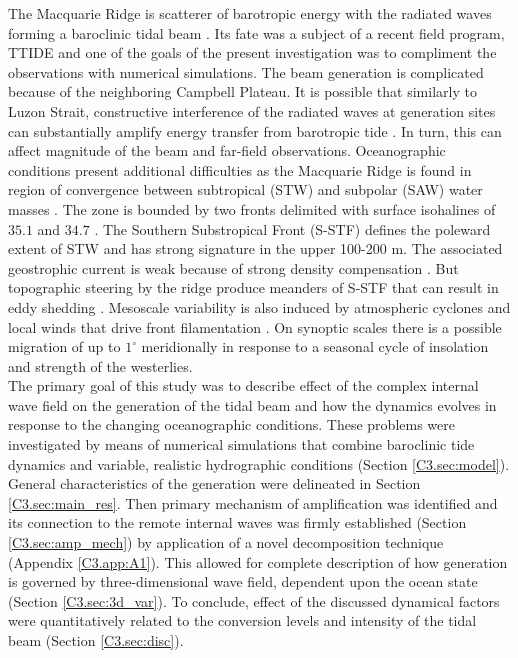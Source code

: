 \documentclass[12pt]{article}
\begin{document}
The Macquarie Ridge is scatterer of barotropic energy with the radiated waves forming a baroclinic 
tidal beam \citep{zhao2016global}. Its fate was a subject of a recent field 
program, TTIDE \citep{pinkel2015breaking} and one of the goals of the present investigation 
was to compliment the observations with numerical simulations. The beam generation is complicated 
because of the neighboring Campbell Plateau. It is possible that similarly to Luzon Strait, 
constructive interference of the radiated waves at generation sites can substantially amplify 
energy transfer from barotropic tide \citep{buijsman2012double, echeverri2010internal}. In turn, 
this can affect magnitude of the beam and far-field observations. Oceanographic conditions present 
additional difficulties as the Macquarie Ridge is found in region of convergence between 
subtropical (STW) and 
subpolar (SAW) water masses 
\citep{chiswell2015physical}. 
The zone is bounded by two fronts delimited with surface isohalines of $35.1$ and $34.7$ 
\citep{belkin1996southern, hamilton2006structure} . The Southern 
Substropical Front 
(S-STF) defines the poleward extent of STW and has strong signature in the upper 100-200 m. The 
associated geostrophic current is weak because of strong density compensation 
\citep{graham2013dynamical}. But topographic 
steering by the ridge produce meanders of S-STF that can result in eddy shedding 
\citep{smith2013interaction}. Mesoscale variability is also induced by atmospheric cyclones and 
local winds that drive front filamentation \citep{james2002summer}. On synoptic scales there is a 
possible 
migration of up to $1^{\circ}$ meridionally \citep{smith2017variability} in response to a seasonal 
cycle of 
insolation and strength of the westerlies.\\

The primary goal of this study was to describe effect of the complex internal wave field on the 
generation of the tidal beam and how the dynamics evolves in response to the changing oceanographic 
conditions. These problems were investigated by means of numerical simulations that combine  
baroclinic tide dynamics and variable, realistic hydrographic conditions (Section 
\ref{C3.sec:model}). General 
characteristics of the generation were delineated in Section \ref{C3.sec:main_res}. Then primary 
mechanism of 
amplification was identified and its connection to the remote internal waves was firmly established 
(Section \ref{C3.sec:amp_mech}) by application of a novel decomposition technique (Appendix 
\ref{C3.app:A1}). 
This allowed for 
complete description of how generation is governed by three-dimensional wave field, dependent upon 
the ocean state (Section \ref{C3.sec:3d_var}). To conclude, effect of the discussed dynamical 
factors were 
quantitatively related to the conversion levels and intensity of the tidal beam (Section 
\ref{C3.sec:disc}).\\
 
\end{document}
